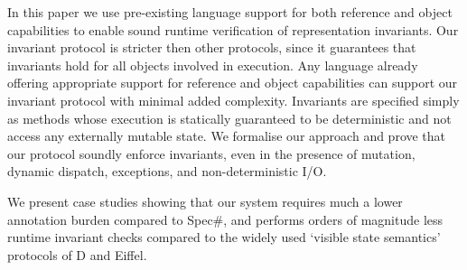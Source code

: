 In this paper we use pre-existing language support for both reference and object capabilities to enable sound runtime verification of representation invariants.
Our invariant protocol is stricter then other  protocols, since it guarantees that invariants hold for all objects involved in execution.
Any language already offering appropriate support for reference and object capabilities can support our invariant protocol with minimal added complexity.
Invariants are specified simply as methods whose execution is statically guaranteed to be deterministic and not access any externally mutable state.
We formalise our approach and prove that our protocol soundly enforce invariants, even in the presence of mutation, dynamic dispatch, exceptions, and non-deterministic I/O.

We present case studies showing that our system requires much a lower annotation burden compared to Spec\#, and performs orders of magnitude less runtime invariant checks compared to the widely used `visible state semantics' protocols of D and Eiffel.
